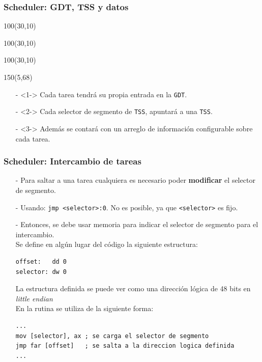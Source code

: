 \documentclass[aspectratio=169]{beamer}
\begin{document}
\begin{frame}[fragile]
    \frametitle{Scheduler: GDT, TSS y datos}
    \begin{textblock}{100}(30,10)  \end{textblock}
    \begin{textblock}{100}(30,10)  \end{textblock}
    \begin{textblock}{100}(30,10)  \end{textblock}
    \begin{textblock}{150}(5,68)
    \begin{itemize}
     \item[-]<1-> Cada tarea tendrá su propia entrada en la \texttt{GDT}.
     \item[-]<2-> Cada selector de segmento de \texttt{TSS}, apuntará a una \texttt{TSS}.
     \item[-]<3-> Además se contará con un arreglo de información configurable sobre cada tarea.
    \end{itemize}
    \end{textblock}
\end{frame}

\begin{frame}[fragile]
\frametitle{Scheduler: Intercambio de tareas}
\begin{itemize}
\setlength\itemsep{0.4cm}
 \item[-] Para saltar a una tarea cualquiera es necesario poder \textbf{modificar} el selector de segmento.
 \pause
 \item[-] Usando: \textcolor{verdeuca}{\texttt{jmp <selector>:0}}. No es posible, ya que \textcolor{verdeuca}{\texttt{<selector>}} es fijo.
 \pause
 \item[-] Entonces, se debe usar memoria para indicar el selector de segmento para el intercambio.\\
\vspace{0.5cm}
\pause
Se define en algún lugar del código la siguiente estructura:
\color{verdeuca}
\begin{verbatim}
offset:   dd 0
selector: dw 0
\end{verbatim}
\normalcolor
\small La estructura definida se puede ver como una dirección lógica de 48 bits en \emph{little endian}\\
\pause
\vspace{0.5cm}
En la rutina se utiliza de la siguiente forma:
\color{verdeuca}
\begin{verbatim}
...
mov [selector], ax ; se carga el selector de segmento
jmp far [offset]   ; se salta a la direccion logica definida
...
\end{verbatim}
\end{itemize}
\end{frame}
\end{document}
